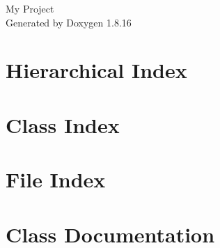 \let\mypdfximage\pdfximage\def\pdfximage{\immediate\mypdfximage}\documentclass[twoside]{book}
\newcommand{\+}{\discretionary{\mbox{\scriptsize$\hookleftarrow$}}{}{}}
\newcommand{\clearemptydoublepage}{%
  \newpage{\pagestyle{empty}\cleardoublepage}%
}
\begin{document}
\hypersetup{pageanchor=false,
             bookmarksnumbered=true,
             pdfencoding=unicode
            }
\begin{titlepage}
\vspace*{7cm}
\begin{center}%
{\Large My Project }\\
\vspace*{1cm}
{\large Generated by Doxygen 1.8.16}\\
\end{center}
\end{titlepage}
\clearemptydoublepage
{}
\tableofcontents
\clearemptydoublepage
{}
\hypersetup{pageanchor=true}

\chapter{Hierarchical Index}

\chapter{Class Index}

\chapter{File Index}

\chapter{Class Documentation}




























\end{document}
